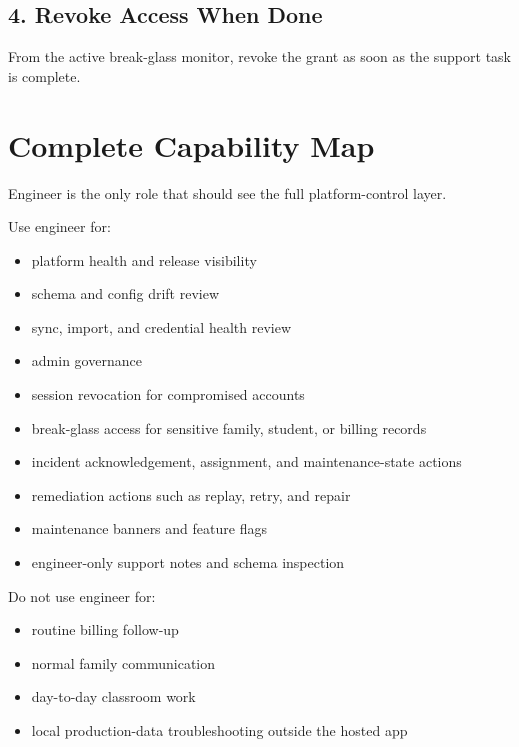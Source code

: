 \documentclass[11pt]{article}
\begin{document}
\subsection*{4. Revoke Access When Done}
From the active break-glass monitor, revoke the grant as soon as the support task is complete.

\section*{Complete Capability Map}
Engineer is the only role that should see the full platform-control layer.

Use engineer for:
\begin{itemize}
  \item platform health and release visibility
  \item schema and config drift review
  \item sync, import, and credential health review
  \item admin governance
  \item session revocation for compromised accounts
  \item break-glass access for sensitive family, student, or billing records
  \item incident acknowledgement, assignment, and maintenance-state actions
  \item remediation actions such as replay, retry, and repair
  \item maintenance banners and feature flags
  \item engineer-only support notes and schema inspection
\end{itemize}

Do not use engineer for:
\begin{itemize}
  \item routine billing follow-up
  \item normal family communication
  \item day-to-day classroom work
  \item local production-data troubleshooting outside the hosted app
\end{itemize}
\end{document}
